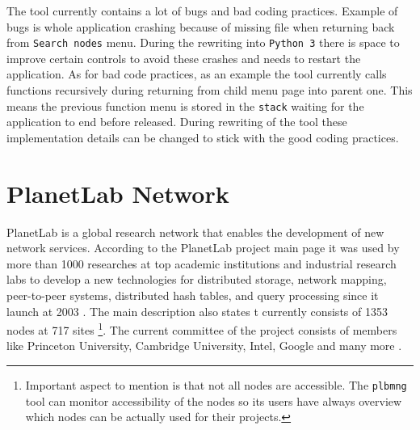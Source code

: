 The tool currently contains a lot of bugs and bad coding practices. Example of bugs is whole application crashing because of missing file when returning back from \texttt{Search nodes} menu. During the rewriting into \texttt{Python 3} there is space to improve certain controls to avoid these crashes and needs to restart the application. As for bad code practices, as an example the tool currently calls functions recursively during returning from child menu page into parent one. This means the previous function menu is stored in the \texttt{stack} waiting for the application to end before released. During rewriting of the tool these implementation details can be changed to stick with the good coding practices. 

\chapter{PlanetLab Network}
\label{chapter:planetlabnetwork}
PlanetLab is a global research network that enables the development of new network services. According to the PlanetLab project main page it was used by more than 1000 researches at top academic institutions and industrial research labs to develop a new technologies for distributed storage, network mapping, peer-to-peer systems, distributed hash tables, and query processing since it launch at 2003 \cite{planetlabmain}. The main description also states t currently consists of 1353 nodes at 717 sites \footnote{Important aspect to mention is that not all nodes are accessible. The \texttt{plbmng} tool can monitor accessibility of the nodes so its users have always overview which nodes can be actually used for their projects.}. The current committee of the project consists of members like Princeton University, Cambridge University, Intel, Google and many more \cite{planetlabmain}.\\

